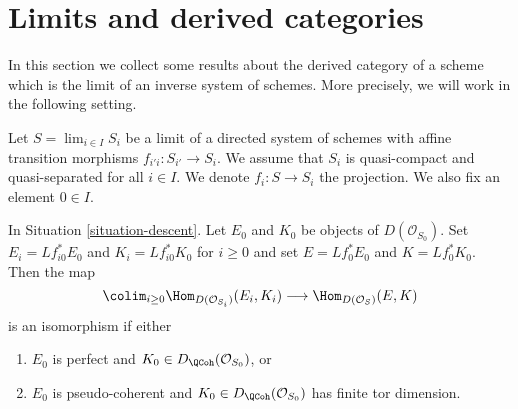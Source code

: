 \section{Limits and derived categories}
\label{section-limits}

\noindent
In this section we collect some results about the derived category
of a scheme which is the limit of an inverse system of schemes.
More precisely, we will work in the following setting.

\begin{situation}
\label{situation-descent}
Let $S = \lim_{i \in I} S_i$ be a limit of a directed system of schemes
with affine transition morphisms $f_{i'i} : S_{i'} \to S_i$.
We assume that $S_i$ is quasi-compact and quasi-separated for all $i \in I$.
We denote $f_i : S \to S_i$ the projection. We also fix an element $0 \in I$.
\end{situation}

\begin{lemma}
\label{lemma-descend-homomorphisms}
In Situation \ref{situation-descent}.
Let $E_0$ and $K_0$ be objects of
$D(\mathcal{O}_{S_0})$.
Set $E_i = Lf_{i0}^*E_0$ and $K_i = Lf_{i0}^*K_0$ for $i \geq 0$
and set $E = Lf_0^*E_0$ and $K = Lf_0^*K_0$. Then the map
$$
\colim_{i \geq 0} \Hom_{D(\mathcal{O}_{S_i})}(E_i, K_i)
\longrightarrow
\Hom_{D(\mathcal{O}_S)}(E, K)
$$
is an isomorphism if either
\begin{enumerate}
\item $E_0$ is perfect and $K_0 \in D_\QCoh(\mathcal{O}_{S_0})$, or
\item $E_0$ is pseudo-coherent and
$K_0 \in D_\QCoh(\mathcal{O}_{S_0})$ has finite tor dimension.
\end{enumerate}
\end{lemma}

